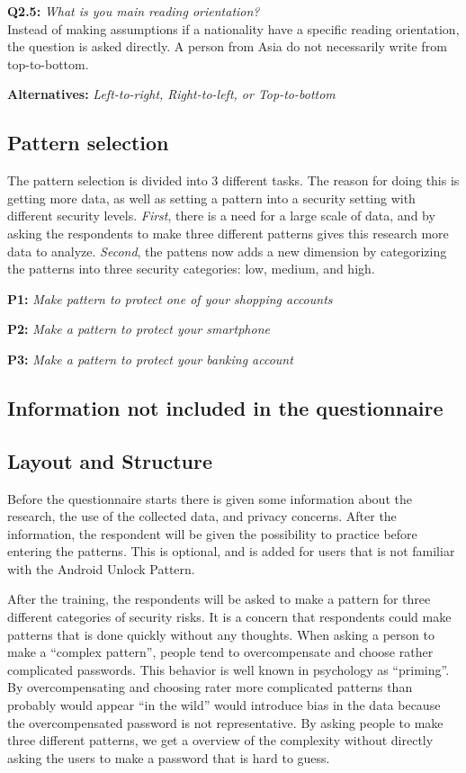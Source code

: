       {\bf Q2.5:} {\it What is you main reading orientation?} \\
      Instead of making assumptions if a nationality have a specific reading orientation, the question is asked directly. A person from Asia do not necessarily write from top-to-bottom.
        \begin{enumerate*}
          \item[ ] {\bf Alternatives:} {\it Left-to-right, Right-to-left, or Top-to-bottom}
        \end{enumerate*}
    

    \subsection*{Pattern selection}
    The pattern selection is divided into 3 different tasks. The reason for doing this is getting more data, as well as setting a pattern into a security setting with different security levels. {\it First}, there is a need for a large scale of data, and by asking the respondents to make three different patterns gives this research more data to analyze. {\it Second}, the pattens now adds a new dimension by categorizing the patterns into three security categories: low, medium, and high. 

    {\bf P1:} {\it Make pattern to protect one of your shopping accounts}

    {\bf P2:} {\it Make a pattern to protect your smartphone}

    {\bf P3:} {\it Make a pattern to protect your banking account}


    \subsection*{Information not included in the questionnaire}
  
  \clearpage
  \subsection{Layout and Structure}\label{sec:layout}

    Before the questionnaire starts there is given some information about the research, the use of the collected data, and privacy concerns. After the information, the respondent will be given the possibility to practice before entering the patterns. This is optional, and is added for users that is not familiar with the Android Unlock Pattern.

    After the training, the respondents will be asked to make a pattern for three different categories of security risks. It is a concern that respondents could make patterns that is done quickly without any thoughts. When asking a person to make a ``complex pattern'', people tend to overcompensate and choose rather complicated passwords. This behavior is well known in psychology as ``priming''. By overcompensating and choosing rater more complicated patterns than probably would appear ``in the wild'' would introduce bias in the data because the overcompensated password is not representative. By asking people to make three different patterns, we get a overview of the complexity without directly asking the users to make a password that is hard to guess.

